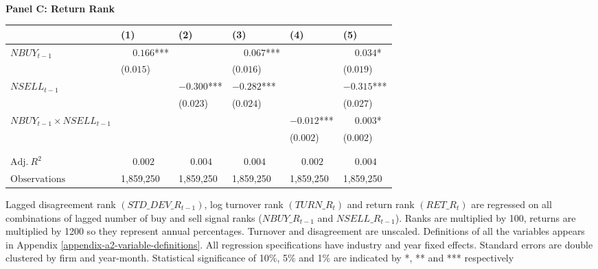 \begin{table}
\begin{threeparttable}
\phantom{ }\\
\textbf{Panel C: Return Rank}
\begin{tabular}[t]{>{\raggedright\arraybackslash}p{4.4cm}>{\raggedright\arraybackslash}p{1.6cm}>{\raggedright\arraybackslash}p{1.6cm}>{\raggedright\arraybackslash}p{1.6cm}>{\raggedright\arraybackslash}p{1.6cm}>{\raggedright\arraybackslash}p{1.6cm}}
\toprule
 & \phantom{-}(1) & \phantom{-}(2) & \phantom{-}(3) & \phantom{-}(4) & \phantom{-}(5)\\
\midrule
$NBUY_{t-1}$ & $\phantom{-}0.166$*** &  & $\phantom{-}0.067$*** &  & $\phantom{-}0.034$*\\
 & (\phantom{-}$0.015$) &  & (\phantom{-}$0.016$) &  & (\phantom{-}$0.019$)\\
\addlinespace
$NSELL_{t-1}$ &  & $-0.300$*** & $-0.282$*** &  & $-0.315$***\\
 &  & (\phantom{-}$0.023$) & (\phantom{-}$0.024$) &  & (\phantom{-}$0.027$)\\
\addlinespace
$NBUY_{t-1} \times NSELL_{t-1}$ &  &  &  & $-0.012$*** & $\phantom{-}0.003$*\\
 &  &  &  & (\phantom{-}$0.002$) & (\phantom{-}$0.002$)\\
 &  &  &  &  \vphantom{1} & \\
\midrule
 &  &  &  &  & \\
$\textrm{Adj.} \: R^2$ & {$\phantom{-}0.002$} & {$\phantom{-}0.004$} & {$\phantom{-}0.004$} & {$\phantom{-}0.002$} & {$\phantom{-}0.004$}\\
$\textrm{Observations}$ & {\phantom{-}1,859,250} & {\phantom{-}1,859,250} & {\phantom{-}1,859,250} & {\phantom{-}1,859,250} & {\phantom{-}1,859,250}\\
\bottomrule
\end{tabular}
\begin{tablenotes}
\item Lagged disagreement rank $(STD\_DEV\_R_{t-1})$, log turnover rank $(TURN\_R_t)$ and return rank $(RET\_R_t)$ are regressed on all combinations of lagged number of buy and sell signal ranks ($NBUY\_R_{t-1}$ and $NSELL\_R_{t-1}$). Ranks are multiplied by 100, returns are multiplied by 1200 so they represent annual percentages. Turnover and disagreement are unscaled. Definitions of all the variables appears in Appendix \ref{appendix-a2-variable-definitions}. All regression specifications have industry and year fixed effects. Standard errors are double clustered by firm and year-month. Statistical significance of 10\%, 5\% and 1\% are indicated by *, ** and *** respectively
\end{tablenotes}
\end{threeparttable}


\end{table}
